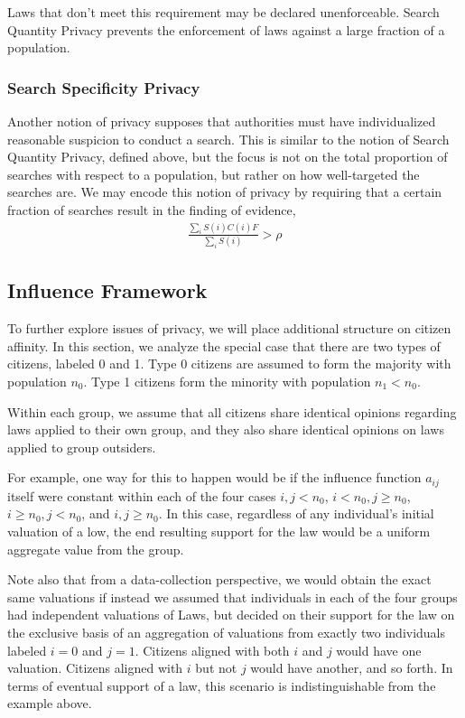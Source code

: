Laws that don't meet this requirement may be declared unenforceable.  Search Quantity Privacy prevents the enforcement of laws against a large fraction of a population.


\subsubsection{Search Specificity Privacy}

Another notion of privacy supposes that authorities must have individualized reasonable suspicion to conduct a search.  This is similar to the notion of Search Quantity Privacy, defined above, but the focus is not on the total proportion of searches with respect to a population, but rather on how well-targeted the searches are.  We may encode this notion of privacy by requiring that a certain fraction of searches result in the finding of evidence,
\begin{align}
\frac{\sum_i S(i)C(i)F}{\sum_i S(i)} > \rho
\end{align}



\subsection{Influence Framework}

To further explore issues of privacy, we will place additional structure on citizen affinity.  In this section, we analyze the special case that there are two types of citizens, labeled 0 and 1.  Type 0 citizens are assumed to form the majority with population $n_0$.  Type 1 citizens form the minority with population $n_1 < n_0$.  

Within each group, we assume that all citizens share identical opinions regarding laws applied to their own group, and they also share identical opinions on laws applied to group outsiders. 

For example, one way for this to happen would be if the influence function $a_{ij}$ itself were constant within each of the four cases $i,j<n_0$, $i<n_0,j\geq n_0$, $i\geq n_0,j < n_0$, and $i,j\geq n_0$. In this case, regardless of any individual's initial valuation of a low, the end resulting support for the law would be a uniform  aggregate value from the group.  

Note also that from a data-collection perspective, we would obtain the exact same valuations if instead we assumed that individuals in each of the four groups had independent valuations of Laws, but decided on their support for the law on the exclusive basis of an aggregation of valuations from exactly two individuals labeled $i=0$ and $j=1$.  Citizens aligned with both $i$ and $j$ would have one valuation.  Citizens aligned with $i$ but not $j$ would have another, and so forth.  In terms of eventual support of a law, this scenario is indistinguishable from the example above.

